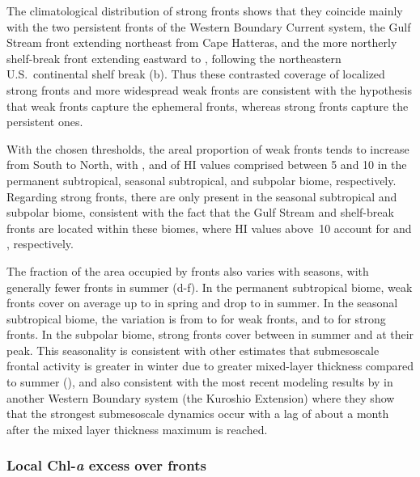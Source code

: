 The climatological distribution of strong fronts shows that they coincide mainly with the two persistent fronts of the Western Boundary Current system, the Gulf Stream front extending northeast from Cape Hatteras, and the more northerly shelf-break front extending eastward to , following the northeastern U.S.\ continental shelf break (b).
Thus these contrasted coverage of localized strong fronts and more widespread weak fronts are consistent with the hypothesis that weak fronts capture the ephemeral fronts, whereas strong fronts capture the persistent ones.

With the chosen thresholds, the areal proportion of weak fronts tends to increase from South to North, with ,  and  of HI values comprised between 5 and 10 in the permanent subtropical, seasonal subtropical, and subpolar biome, respectively.
Regarding strong fronts, there are only present in the seasonal subtropical and subpolar biome, consistent with the fact that the Gulf Stream and shelf-break fronts are located within these biomes, where HI values above~10 account for  and , respectively.

The fraction of the area occupied by fronts also varies with seasons, with generally fewer fronts in summer (d-f).
In the permanent subtropical biome, weak fronts cover on average up to  in spring and drop to  in summer.
In the seasonal subtropical biome, the variation is from  to  for weak fronts, and  to  for strong fronts.
In the subpolar biome, strong fronts cover between  in summer and  at their peak.
This seasonality is consistent with other estimates that submesoscale frontal activity is greater in winter due to greater mixed-layer thickness compared to summer (\cite{callies_2015}), and also consistent with the most recent modeling results by \textcite{dong_2020} in another Western Boundary system (the Kuroshio Extension) where they show that the strongest submesoscale dynamics occur with a lag of about a month after the mixed layer thickness maximum is reached.


\subsubsection{Local Chl-\textit{a} excess over fronts}

